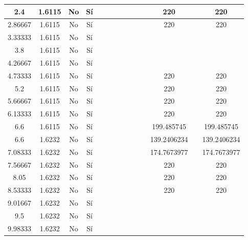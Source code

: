 \begin{table}[H]
{\begin{tabular}{|c|c|c|c|c|c|c|c|c|c|c|c|c|c|}
\hline
2.4 & 1.6115 & No  & Sí  &     &     &     &     &     &     &     & 220 &     & 220 \bigstrut\\
\hline
2.86667 & 1.6115 & No  & Sí  &     &     &     &     &     &     &     & 220 &     & 220 \bigstrut\\
\hline
3.33333 & 1.6115 & No  & Sí  &     &     &     &     &     &     &     &     &     &  \bigstrut\\
\hline
3.8 & 1.6115 & No  & Sí  &     &     &     &     &     &     &     &     &     &  \bigstrut\\
\hline
4.26667 & 1.6115 & No  & Sí  &     &     &     &     &     &     &     &     &     &  \bigstrut\\
\hline
4.73333 & 1.6115 & No  & Sí  &     &     &     &     &     &     &     & 220 &     & 220 \bigstrut\\
\hline
5.2 & 1.6115 & No  & Sí  &     &     &     &     &     &     &     & 220 &     & 220 \bigstrut\\
\hline
5.66667 & 1.6115 & No  & Sí  &     &     &     &     &     &     &     & 220 &     & 220 \bigstrut\\
\hline
6.13333 & 1.6115 & No  & Sí  &     &     &     &     &     &     &     & 220 &     & 220 \bigstrut\\
\hline
6.6 & 1.6115 & No  & Sí  &     &     &     &     &     &     &     & 199.485745 &     & 199.485745 \bigstrut\\
\hline
6.6 & 1.6232 & No  & Sí  &     &     &     &     &     &     &     & 139.2406234 &     & 139.2406234 \bigstrut\\
\hline
7.08333 & 1.6232 & No  & Sí  &     &     &     &     &     &     &     & 174.7673977 &     & 174.7673977 \bigstrut\\
\hline
7.56667 & 1.6232 & No  & Sí  &     &     &     &     &     &     &     & 220 &     & 220 \bigstrut\\
\hline
8.05 & 1.6232 & No  & Sí  &     &     &     &     &     &     &     & 220 &     & 220 \bigstrut\\
\hline
8.53333 & 1.6232 & No  & Sí  &     &     &     &     &     &     &     & 220 &     & 220 \bigstrut\\
\hline
9.01667 & 1.6232 & No  & Sí  &     &     &     &     &     &     &     &     &     &  \bigstrut\\
\hline
9.5 & 1.6232 & No  & Sí  &     &     &     &     &     &     &     &     &     &  \bigstrut\\
\hline
9.98333 & 1.6232 & No  & Sí  &     &     &     &     &     &     &     &     &     &  \bigstrut\\

\end{tabular}}
\end{table}
